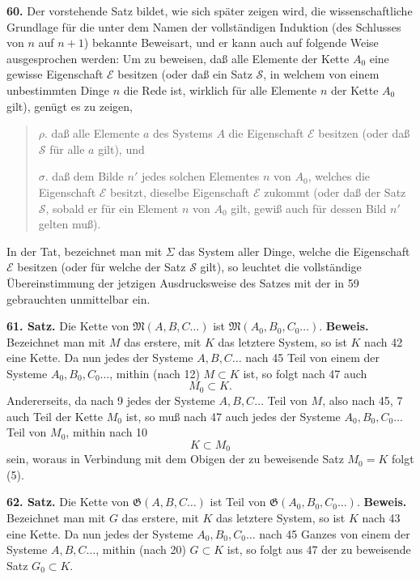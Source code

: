 \documentclass[11pt]{article}
\newcommand{\Mf}{\mathfrak{M}}
\newcommand{\Gf}{\mathfrak{G}}
\newcommand{\partof}{\mathrel{\subset}}
\begin{document}
\noindent\textbf{60.} Der vorstehende Satz bildet, wie sich später zeigen wird, die wissenschaftliche Grundlage für die unter dem Namen der vollständigen Induktion (des Schlusses von $n$ auf $n+1$) bekannte Beweisart, und er kann auch auf folgende Weise ausgesprochen werden: Um zu beweisen, daß alle Elemente der Kette $A_0$ eine gewisse Eigenschaft $\mathcal E$ besitzen (oder daß ein Satz $\mathcal S$, in welchem von einem unbestimmten Dinge $n$ die Rede ist, wirklich für alle Elemente $n$ der Kette $A_0$ gilt), genügt es zu zeigen,

\begin{quote}
\(\rho.\) daß alle Elemente \(a\) des Systems \(A\) die Eigenschaft \(\mathcal E\) besitzen (oder daß \(\mathcal S\) für alle \(a\) gilt), und

\(\sigma.\) daß dem Bilde \(n'\) jedes solchen Elementes \(n\) von \(A_0\), welches die Eigenschaft \(\mathcal E\) besitzt, dieselbe Eigenschaft \(\mathcal E\) zukommt (oder daß der Satz \(\mathcal S\), sobald er für ein Element \(n\) von \(A_0\) gilt, gewiß auch für dessen Bild \(n'\) gelten muß).
\end{quote}

In der Tat, bezeichnet man mit $\Sigma$ das System aller Dinge, welche die Eigenschaft $\mathcal E$ besitzen (oder für welche der Satz $\mathcal S$ gilt), so leuchtet die vollständige Übereinstimmung der jetzigen Ausdrucksweise des Satzes mit der in 59 gebrauchten unmittelbar ein.

\noindent\textbf{61. Satz.} Die Kette von $\Mf(A,B,C\ldots)$ ist $\Mf(A_0,B_0,C_0\ldots)$. \textbf{Beweis.} Bezeichnet man mit $M$ das erstere, mit $K$ das letztere System, so ist $K$ nach 42 eine Kette. Da nun jedes der Systeme $A,B,C\ldots$ nach 45 Teil von einem der Systeme $A_0,B_0,C_0\ldots$, mithin (nach 12) $M\partof K$ ist, so folgt nach 47 auch
\[
M_0\partof K.
\]
Andererseits, da nach 9 jedes der Systeme $A,B,C\ldots$ Teil von $M$, also nach 45, 7 auch Teil der Kette $M_0$ ist, so muß nach 47 auch jedes der Systeme $A_0,B_0,C_0\ldots$ Teil von $M_0$, mithin nach 10
\[
K\partof M_0
\]
sein, woraus in Verbindung mit dem Obigen der zu beweisende Satz $M_0=K$ folgt (5).

\noindent\textbf{62. Satz.} Die Kette von $\Gf(A,B,C\ldots)$ ist Teil von $\Gf(A_0,B_0,C_0\ldots)$. \textbf{Beweis.} Bezeichnet man mit $G$ das erstere, mit $K$ das letztere System, so ist $K$ nach 43 eine Kette. Da nun jedes der Systeme $A_0,B_0,C_0\ldots$ nach 45 Ganzes von einem der Systeme $A,B,C\ldots$, mithin (nach 20) $G\partof K$ ist, so folgt aus 47 der zu beweisende Satz $G_0\partof K$.
\end{document}
